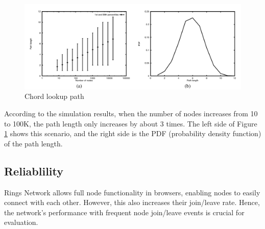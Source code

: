 \documentclass[twocolumn]{article}
\begin{document}
\begin{figure}[htbp]
  \label{path}
  \includegraphics[width=\linewidth]{imgs/rings/path.png}
  \caption{Chord lookup path \cite{Chord}}
\end{figure}

According to the simulation results, when the number of nodes increases from 10 to 100K, the path length only increases by about 3 times. The left side of Figure \ref{path} shows this scenario, and the right side is the PDF (probability density function) of the path length.
\subsection{Reliablility}

Rings Network allows full node functionality in browsers, enabling nodes to easily connect with each other. However, this also increases their join/leave rate. Hence, the network's performance with frequent node join/leave events is crucial for evaluation.
\end{document}
